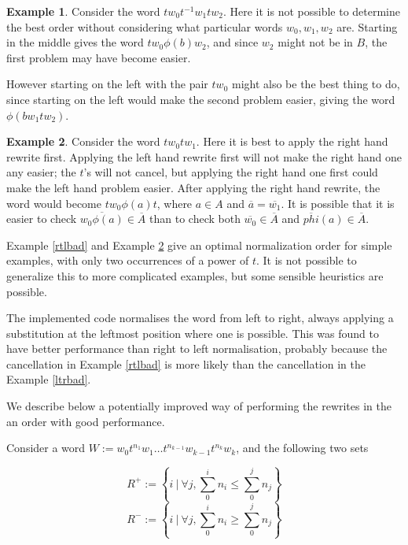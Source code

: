 \documentclass[12pt]{article} %
\theoremstyle{definition}
\theoremstyle{definition}
\theoremstyle{definition}
\theoremstyle{definition}
\theoremstyle{definition}
\theoremstyle{definition}
\newtheorem{exmpl}{Example}[theorem]
\begin{document}
\begin{exmpl}
  Consider the word $tw_0t^{-1}w_1tw_2$. Here it is not possible to determine the best order without
  considering what particular words $w_0, w_1, w_2$ are. Starting in the middle gives the word
  $tw_0\phi(b)w_2$, and since $w_2$ might not be in $B$, the first problem may have become easier.

  However starting on the left with the pair $tw_0$
  might also be the best thing to do, since starting on the left would
  make the second problem easier, giving the word $\phi(bw_1 t w_2)$.
\end{exmpl}

\begin{exmpl}\label{ltrbad2}
  Consider the word $tw_0tw_1$. Here it is best to apply the right hand rewrite first.
  Applying the left hand rewrite first will not make the right hand one any easier; the $t$'s will
  not cancel, but applying the right hand one first could make the left hand problem easier.
  After applying the right hand rewrite, the word would become $tw_0\phi(a)t$, where $a \in A$
  and $\overline{a} = \overline{w_1}$. It is possible that it is easier to check $\overline{w_0\phi(a)} \in \overline{A}$
  than to check both $\overline{w_0} \in \overline{A}$ and $\overline{phi}(a) \in \overline{A}$.
\end{exmpl}

Example \ref{rtlbad} and Example \ref{ltrbad2} give an optimal normalization order
for simple examples, with only two occurrences of a power of $t$.
It is not possible to generalize this to more complicated examples,
but some sensible heuristics are possible.

The implemented code normalises the word from left to right, always applying
a substitution at the leftmost position where one is possible. This was found to have better
performance than right to left normalisation, probably because the cancellation
in Example \ref{rtlbad} is more likely than the cancellation in the Example \ref{ltrbad}.

We describe below a potentially improved way of performing the rewrites in the
an order with good performance.

Consider a word $W := w_0t^{n_1}w_1 \dots t^{n_{k-1}}w_{k-1}t^{n_k}w_k$, and the
following two sets

\begin{equation}
    R^{+} := \left\{ i \ | \ \forall j, \sum_0^i n_i \le \sum_0^j n_j\right\}
\end{equation}
\begin{equation}
    R^{-} := \left\{ i \ | \ \forall j, \sum_0^i n_i \ge \sum_0^j n_j\right\}
\end{equation}
\end{document}
